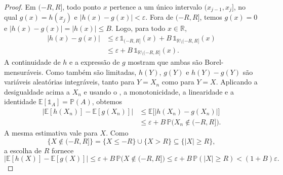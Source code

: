 \documentclass[12pt,portuguese]{article}
\theoremstyle{definition}
\theoremstyle{plainexercise}
\theoremstyle{starredexercise}
\theoremstyle{definition}
\begin{document}
\begin{proof}
Em $(-R,R]$, todo ponto $x$ pertence a um único intervalo $(x_{j-1},x_j]$,
no qual $g(x)=h(x_j)$ e $|h(x)-g(x)|<\varepsilon$. Fora de $(-R,R]$, temos
$g(x)=0$ e $|h(x)-g(x)|=|h(x)|\leqslant B$. Logo, para todo $x\in\mathbb{R}$,
\begin{align*}
|h(x)-g(x)|
&\leqslant
\varepsilon\,\mathds{1}_{(-R,R]}(x) +B\,\mathds{1}_{\mathbb{R}\setminus(-R,R]}(x)
\\[0.3cm]
&\leqslant
\varepsilon+B\,\mathds{1}_{\mathbb{R}\setminus(-R,R]}(x).
\end{align*}
A continuidade de $h$ e a expressão de $g$ mostram que ambas são
Borel-mensuráveis. Como também são limitadas, $h(Y)$, $g(Y)$ e
$h(Y)-g(Y)$ são variáveis aleatórias integráveis, tanto para $Y=X_n$ como
para $Y=X$. Aplicando a desigualdade acima a $X_n$ e usando o
, a monotonicidade, a linearidade e a identidade
$\mathbb{E}[\mathds{1}_A]=\mathbb{P}(A)$, obtemos
\begin{align*}
\bigl|\mathbb{E}[h(X_n)]-\mathbb{E}[g(X_n)]\bigr|
&\leqslant\mathbb{E}\bigl[|h(X_n)-g(X_n)|\bigr]\\[0.3cm]
&\leqslant\varepsilon+B\,\mathbb{P}\bigl(X_n\notin(-R,R]\bigr).
\end{align*}
A mesma estimativa vale para $X$. Como
\[
\{X\notin(-R,R]\}=\{X\leqslant -R\}\cup\{X>R\}
\subseteq\{|X|\geqslant R\},
\]
a escolha de $R$ fornece
\begin{equation}\label{eq:erro-aprox-X}
\bigl|\mathbb{E}[h(X)]-\mathbb{E}[g(X)]\bigr|
\leqslant\varepsilon+B\,\mathbb{P}\bigl(X\notin(-R,R]\bigr)
\leqslant\varepsilon+B\,\mathbb{P}(|X|\geqslant R)
<(1+B)\varepsilon.
\end{equation}


\end{proof}
\end{document}
